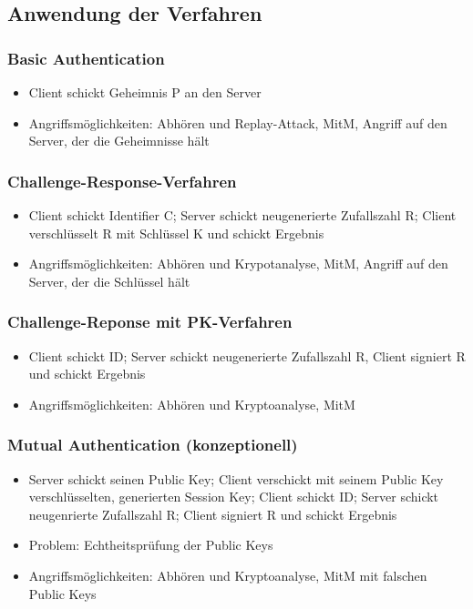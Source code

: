 \subsection{Anwendung der Verfahren}

\subsubsection{Basic Authentication}
\begin{itemize}
	\item Client schickt Geheimnis P an den Server
	\item Angriffsmöglichkeiten: Abhören und Replay-Attack, MitM, Angriff auf den Server, der die Geheimnisse hält
\end{itemize}

\subsubsection{Challenge-Response-Verfahren}
\begin{itemize}
	\item Client schickt Identifier C; Server schickt neugenerierte Zufallszahl R; Client verschlüsselt R mit Schlüssel K und schickt Ergebnis
	\item Angriffsmöglichkeiten: Abhören und Krypotanalyse, MitM, Angriff auf den Server, der die Schlüssel hält
\end{itemize}

\subsubsection{Challenge-Reponse mit PK-Verfahren}
\begin{itemize}
	\item Client schickt ID; Server schickt neugenerierte Zufallszahl R, Client signiert R und schickt Ergebnis
	\item Angriffsmöglichkeiten: Abhören und Kryptoanalyse, MitM
\end{itemize}

\subsubsection{Mutual Authentication (konzeptionell)}
\begin{itemize}
	\item Server schickt seinen Public Key; Client verschickt mit seinem Public Key verschlüsselten, generierten Session Key; Client schickt ID; Server schickt neugenrierte Zufallszahl R; Client signiert R und schickt Ergebnis
	\item Problem: Echtheitsprüfung der Public Keys
	\item Angriffsmöglichkeiten: Abhören und Kryptoanalyse, MitM mit falschen Public Keys
\end{itemize}

